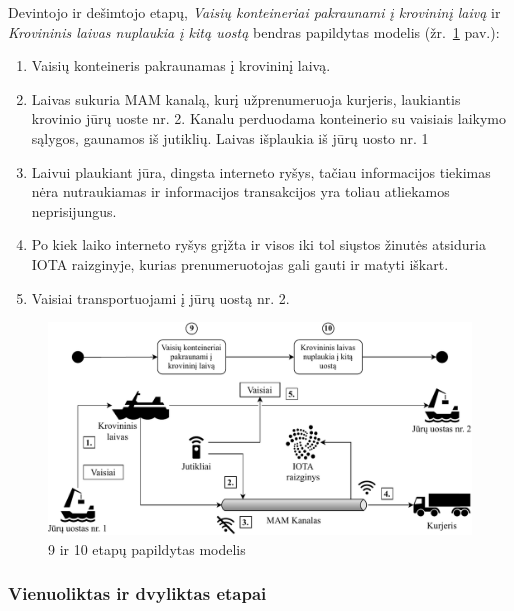 Devintojo ir dešimtojo etapų, \textit{Vaisių konteineriai pakraunami į krovininį laivą} ir \textit{Krovininis laivas nuplaukia į kitą uostą} bendras papildytas modelis (žr.~\ref{img:16} pav.):
\begin{enumerate}
    \item Vaisių konteineris pakraunamas į krovininį laivą.
    \item Laivas sukuria MAM kanalą, kurį užprenumeruoja kurjeris, laukiantis krovinio jūrų uoste nr. 2. Kanalu perduodama konteinerio su vaisiais laikymo sąlygos, gaunamos iš jutiklių. Laivas išplaukia iš jūrų uosto nr. 1
    \item Laivui plaukiant jūra, dingsta interneto ryšys, tačiau informacijos tiekimas nėra nutraukiamas ir informacijos transakcijos yra toliau atliekamos neprisijungus. 
    \item Po kiek laiko interneto ryšys grįžta ir visos iki tol siųstos žinutės atsiduria IOTA raizginyje, kurias prenumeruotojas gali gauti ir matyti iškart.
    \item Vaisiai transportuojami į jūrų uostą nr. 2.
\end{enumerate}

\begin{figure}[H]
    \centering
    \includegraphics[scale=0.8]{images/iota-usecase-9-10}
    \caption{9 ir 10 etapų papildytas modelis}
    \label{img:16}
\end{figure}




\subsubsection{Vienuoliktas ir dvyliktas etapai} \label{subsection:uc-11-12}

